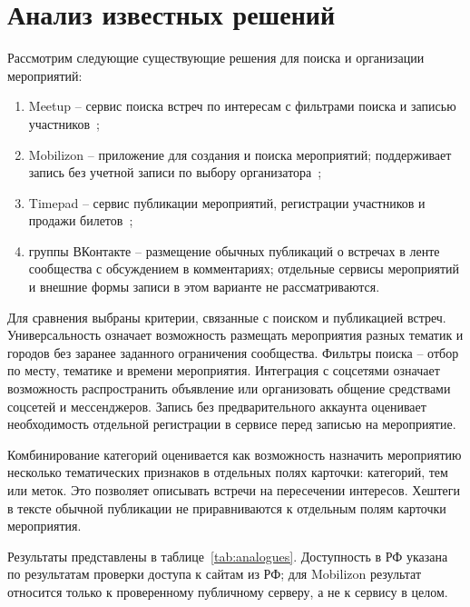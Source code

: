 \section{Анализ известных решений}

Рассмотрим следующие существующие решения для поиска и организации мероприятий:
\begin{enumerate}[label=\arabic*)]
    \item Meetup -- сервис поиска встреч по интересам с фильтрами поиска и записью участников~\cite{meetup};
    \item Mobilizon -- приложение для создания и поиска мероприятий; поддерживает запись без учетной записи по выбору организатора~\cite{mobilizon};
    \item Timepad -- сервис публикации мероприятий, регистрации участников и продажи билетов~\cite{timepad};
    \item группы ВКонтакте -- размещение обычных публикаций о встречах в ленте сообщества с обсуждением в комментариях; отдельные сервисы мероприятий и внешние формы записи в этом варианте не рассматриваются.
\end{enumerate}

Для сравнения выбраны критерии, связанные с поиском и публикацией встреч. Универсальность означает возможность размещать мероприятия разных тематик и городов без заранее заданного ограничения сообщества. Фильтры поиска -- отбор по месту, тематике и времени мероприятия. Интеграция с соцсетями означает возможность распространить объявление или организовать общение средствами соцсетей и мессенджеров. Запись без предварительного аккаунта оценивает необходимость отдельной регистрации в сервисе перед записью на мероприятие.

Комбинирование категорий оценивается как возможность назначить мероприятию несколько тематических признаков в отдельных полях карточки: категорий, тем или меток. Это позволяет описывать встречи на пересечении интересов. Хештеги в тексте обычной публикации не приравниваются к отдельным полям карточки мероприятия.

Результаты представлены в таблице~\ref{tab:analogues}. Доступность в РФ указана по результатам проверки доступа к сайтам из РФ; для Mobilizon результат относится только к проверенному публичному серверу, а не к сервису в целом.

